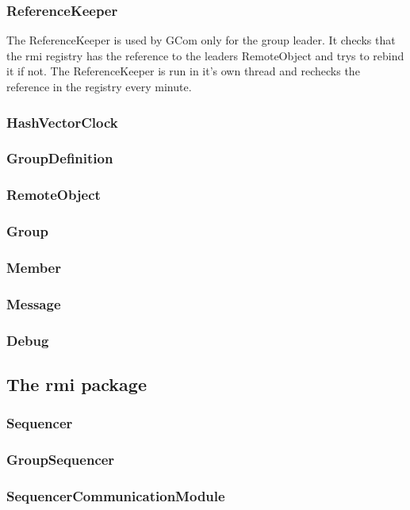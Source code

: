 \documentclass[english]{article}
\begin{document}
\subsubsection{ReferenceKeeper}
The ReferenceKeeper is used by GCom only for the group leader. It checks that the rmi registry has the reference to the leaders RemoteObject and trys to rebind it if not. The ReferenceKeeper is run in it's own thread and rechecks the reference in the registry every minute.

\subsubsection{HashVectorClock}


\subsubsection{GroupDefinition}
\subsubsection{RemoteObject}
\subsubsection{Group}
\subsubsection{Member}
\subsubsection{Message}
\subsubsection{Debug}

\subsection{The rmi package}
\subsubsection{Sequencer}
\subsubsection{GroupSequencer}
\subsubsection{SequencerCommunicationModule}
\end{document}
